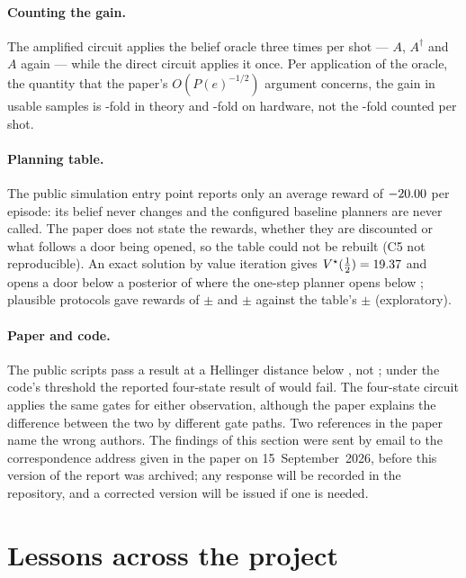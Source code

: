 \documentclass[11pt,a4paper]{article}
\begin{document}
\paragraph{Counting the gain.} The amplified circuit applies the belief oracle three times per shot --- $A$, $A^\dagger$ and $A$ again ---
while the direct circuit applies it once. Per application of the oracle, the quantity that the paper's $O(P(e)^{-1/2})$ argument
concerns, the gain in usable samples is \PsixQOneTheory-fold in theory and \PsixHwPerOracle-fold on hardware, not the
\PsixPaperAmp-fold counted per shot.

\paragraph{Planning table.} The public simulation entry point reports only an average reward of $-20.00$ per episode: its
belief never changes and the configured baseline planners are never called. The paper does not state the rewards, whether they are
discounted or what follows a door being opened, so the table could not be rebuilt (C5 not reproducible). An exact solution by value
iteration gives $V^\star(\tfrac12)=19.37$ and opens a door below a posterior of \PsixQTwoThreshold{} where the one-step planner opens
below \PsixQTwoGreedyThreshold; plausible protocols gave rewards of \PsixCFiveHorizonMean{} $\pm$ \PsixCFiveHorizonSD{} and
\PsixCFiveOptimalMean{} $\pm$ \PsixCFiveOptimalSD{} against the table's \PsixPaperTableSixQBRL{} $\pm$ \PsixPaperTableSixSD{} (exploratory).

\paragraph{Paper and code.} The public scripts pass a result at a Hellinger distance below \PsixCodePass, not \PsixPaperPass; under the code's
threshold the reported four-state result of \PsixPaperFourObsZero{} would fail. The four-state circuit applies the same gates for either
observation, although the paper explains the difference between the two by different gate paths. Two references in the paper name the
wrong authors.
The findings of this section were sent by email to the correspondence address given in the paper on 15~September~2026, before this
version of the report was archived; any response will be recorded in the repository, and a corrected version will be issued if one
is needed.

\section{Lessons across the project}
\end{document}
